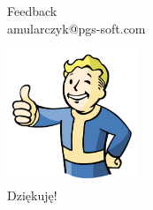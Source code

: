 \documentclass{beamer}
\begin{document}
\begin{frame}{}
	\begin{center}
		\Huge{Feedback}\\
		\Large{amularczyk@pgs-soft.com}
	\end{center}
\end{frame}

\begin{frame}{}
	\begin{center}
  		\includegraphics[height=4cm]{ok.png} \\
		\Huge{Dziękuję!}
	\end{center}
\end{frame}
\end{document}
